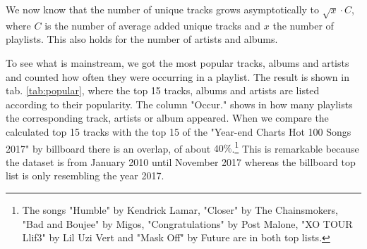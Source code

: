 We now know that the number of unique tracks grows asymptotically to $\sqrt{x} \cdot C$, where $C$ is the number of average added unique tracks and $x$ the number of playlists. This also holds for the number of artists and albums. 

To see what is mainstream, we got the most popular tracks, albums and artists and counted how often they were occurring in a playlist. The result is shown in tab. \ref{tab:popular}, where the top 15 tracks, albums and artists are listed according to their popularity. The column "Occur." shows in how many playlists the corresponding track, artists or album appeared. When we compare the calculated top 15 tracks with the top 15 of the "Year-end Charts Hot 100 Songs 2017" by billboard there is an overlap, of about $40 \%$.\footnote{The songs "Humble" by Kendrick Lamar, "Closer" by The Chainsmokers, "Bad and Boujee" by Migos, "Congratulations" by Post Malone, "XO TOUR Llif3" by Lil Uzi Vert and "Mask Off" by Future are in both top lists.}\citep{BillboardMedia} This is remarkable because the dataset is from January 2010 until November 2017 whereas the billboard top list is only resembling the year 2017.

